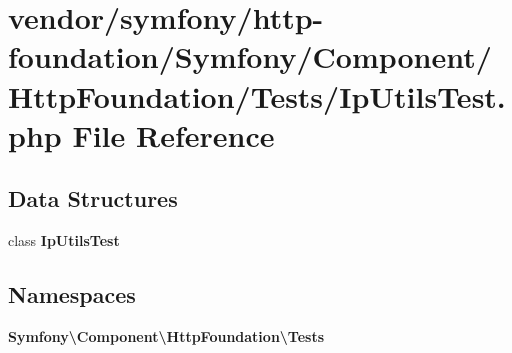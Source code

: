 \section{vendor/symfony/http-\/foundation/\+Symfony/\+Component/\+Http\+Foundation/\+Tests/\+Ip\+Utils\+Test.php File Reference}
\label{_ip_utils_test_8php}
\subsection*{Data Structures}
\begin{DoxyCompactItemize}
\item 
class {\bf Ip\+Utils\+Test}
\end{DoxyCompactItemize}
\subsection*{Namespaces}
\begin{DoxyCompactItemize}
\item 
 {\bf Symfony\textbackslash{}\+Component\textbackslash{}\+Http\+Foundation\textbackslash{}\+Tests}
\end{DoxyCompactItemize}
